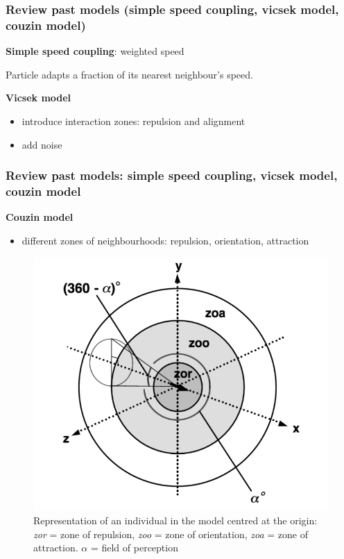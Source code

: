 \documentclass[compress]{beamer}
\begin{document}
\begin{frame}
	\frametitle{Review past models (simple speed coupling, vicsek model, couzin model)}
	
\textbf{Simple speed coupling}: weighted speed


Particle adapts a fraction of its nearest neighbour's speed.

\hspace{3cm}

	\textbf{Vicsek model} \\
	
	
	\begin{itemize}
		\item introduce interaction zones: repulsion and alignment
		\item add noise
	\end{itemize}

\end{frame}




\begin{frame}
	\frametitle{Review past models: simple speed coupling, vicsek model, couzin model}
	
	\textbf{Couzin model}
	
	\begin{itemize}
		\item different zones of neighbourhoods: repulsion, orientation, attraction
	\end{itemize}
	
\begin{figure}
	\includegraphics[width=.45\columnwidth]{./img/zones.png}
	\caption{Representation of an individual in the model centred at the origin: \textit{zor} = zone of repulsion, \textit{zoo} = zone of orientation, \textit{zoa} = zone of attraction. \( \alpha \) = field of perception}
	\label{zones}
\end{figure}

	
\end{frame}
\end{document}
